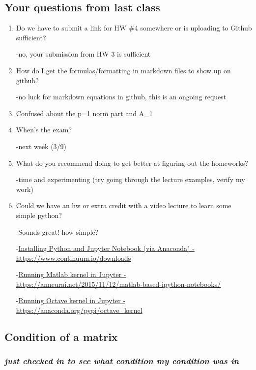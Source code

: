\documentclass[11pt]{article}
\begin{document}
\subsection{Your questions from last
class}\label{your-questions-from-last-class}

\begin{enumerate}
\def\labelenumi{\arabic{enumi}.}
\item
  Do we have to submit a link for HW \#4 somewhere or is uploading to
  Github sufficient?

  -no, your submission from HW 3 is sufficient
\item
  How do I get the formulas/formatting in markdown files to show up on
  github?

  -no luck for markdown equations in github, this is an ongoing request
\item
  Confused about the p=1 norm part and
  \textbar{}\textbar{}A\textbar{}\textbar{}\_1
\item
  When's the exam?

  -next week (3/9)
\item
  What do you recommend doing to get better at figuring out the
  homeworks?

  -time and experimenting (try going through the lecture examples,
  verify my work)
\item
  Could we have an hw or extra credit with a video lecture to learn some
  simple python?

  -Sounds great! how simple?

  -\href{https://www.continuum.io/downloads}{Installing Python and
  Jupyter Notebook (via Anaconda) - https://www.continuum.io/downloads}

  -\href{https://anneurai.net/2015/11/12/matlab-based-ipython-notebooks/}{Running
  Matlab kernel in Jupyter -
  https://anneurai.net/2015/11/12/matlab-based-ipython-notebooks/}

  -\href{https://anaconda.org/pypi/octave_kernel}{Running Octave kernel
  in Jupyter - https://anaconda.org/pypi/octave\_kernel}
\end{enumerate}

    \subsection{Condition of a matrix}\label{condition-of-a-matrix}

\subsubsection{\texorpdfstring{\emph{just checked in to see what
condition my condition was
in}}{just checked in to see what condition my condition was in}}\label{just-checked-in-to-see-what-condition-my-condition-was-in}
\end{document}
